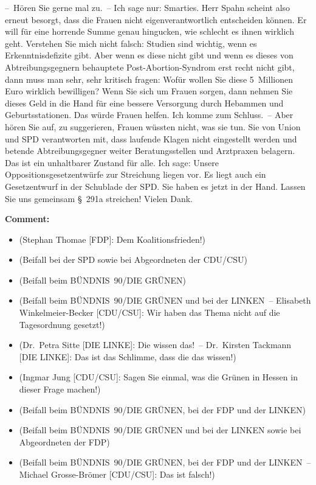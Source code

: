 \documentclass{article}
\begin{document}
– Hören Sie gerne mal zu. – Ich sage nur: Smarties. Herr Spahn scheint also erneut besorgt, dass die Frauen nicht eigenverantwortlich entscheiden können. Er will für eine horrende Summe genau hingucken, wie schlecht es ihnen wirklich geht. Verstehen Sie mich nicht falsch: Studien sind wichtig, wenn es Erkenntnisdefizite gibt. Aber wenn es diese nicht gibt und wenn es dieses von Abtreibungsgegnern behauptete Post-Abortion-Syndrom erst recht nicht gibt, dann muss man sehr, sehr kritisch fragen: Wofür wollen Sie diese 5 Millionen Euro wirklich bewilligen?  Wenn Sie sich um Frauen sorgen, dann nehmen Sie dieses Geld in die Hand für eine bessere Versorgung durch Hebammen und Geburtsstationen. Das würde Frauen helfen.  Ich komme zum Schluss. – Aber hören Sie auf, zu suggerieren, Frauen wüssten nicht, was sie tun. Sie von Union und SPD verantworten mit, dass laufende Klagen nicht eingestellt werden und betende Abtreibungsgegner weiter Beratungsstellen und Arztpraxen belagern. Das ist ein unhaltbarer Zustand für alle.  Ich sage: Unsere Oppositionsgesetzentwürfe zur Streichung liegen vor. Es liegt auch ein Gesetzentwurf in der Schublade der SPD. Sie haben es jetzt in der Hand. Lassen Sie uns gemeinsam § 291a streichen! Vielen Dank.  

\noindent\textbf{Comment:}
\begin{itemize}
    \setlength\itemsep{-3pt}
    \item (Stephan Thomae [FDP]: Dem Koalitionsfrieden!)
    \setlength\itemsep{-3pt}
    \item (Beifall bei der SPD sowie bei Abgeordneten der CDU/CSU)
    \setlength\itemsep{-3pt}
    \item (Beifall beim BÜNDNIS 90/DIE GRÜNEN)
    \setlength\itemsep{-3pt}
    \item (Beifall beim BÜNDNIS 90/DIE GRÜNEN und bei der LINKEN – Elisabeth Winkelmeier-­Becker [CDU/CSU]: Wir haben das Thema nicht auf die Tagesordnung gesetzt!)
    \setlength\itemsep{-3pt}
    \item (Dr. Petra Sitte [DIE LINKE]: Die wissen das! – Dr. Kirsten Tackmann [DIE LINKE]: Das ist das Schlimme, dass die das wissen!)
    \setlength\itemsep{-3pt}
    \item (Ingmar Jung [CDU/CSU]: Sagen Sie einmal, was die Grünen in Hessen in dieser Frage machen!)
    \setlength\itemsep{-3pt}
    \item (Beifall beim BÜNDNIS 90/DIE GRÜNEN, bei der FDP und der LINKEN)
    \setlength\itemsep{-3pt}
    \item (Beifall beim BÜNDNIS 90/DIE GRÜNEN und bei der LINKEN sowie bei Abgeordneten der FDP)
    \setlength\itemsep{-3pt}
    \item (Beifall beim BÜNDNIS 90/DIE GRÜNEN, bei der FDP und der LINKEN – Michael Grosse-Brömer [CDU/CSU]: Das ist falsch!)
\end{itemize}
\end{document}
